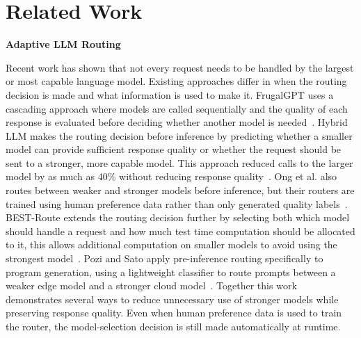 \documentclass[sigconf,nonacm]{acmart}
\begin{document}
\section{Related Work}
\noindent\textbf{Adaptive LLM Routing}\par
\noindent Recent work has shown that not every request needs to be handled by the largest or most capable language model. Existing approaches differ in when the routing decision is made and what information is used to make it. FrugalGPT uses a cascading approach where models are called sequentially and the quality of each response is evaluated before deciding whether another model is needed~\cite{chen2024frugalgpt}. Hybrid LLM makes the routing decision before inference by predicting whether a smaller model can provide sufficient response quality or whether the request should be sent to a stronger, more capable model. This approach reduced calls to the larger model by as much as 40\% without reducing response quality~\cite{ding2024hybridllm}. Ong et al. also routes between weaker and stronger models before inference, but their routers are trained using human preference data rather than only generated quality labels~\cite{ong2025routellm}. BEST-Route extends the routing decision further by selecting both which model should handle a request and how much test time computation should be allocated to it, this allows additional computation on smaller models to avoid using the strongest model~\cite{ding2025bestroute}. Pozi and Sato apply pre-inference routing specifically to program generation, using a lightweight classifier to route prompts between a weaker edge model and a stronger cloud model~\cite{pozi2025routing}. Together this work demonstrates several ways to reduce unnecessary use of stronger models while preserving response quality. Even when human preference data is used to train the router, the model-selection decision is still made automatically at runtime. 
\end{document}
